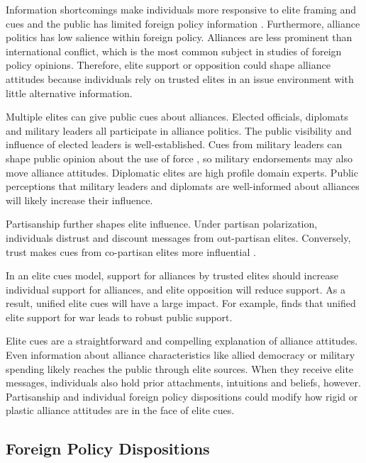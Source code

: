 \documentclass[12pt]{article}
\begin{document}
Information shortcomings make individuals more responsive to elite framing and cues \citep{Druckman2001, Peterson2017} and the public has limited foreign policy information \citep{BaumPotter2008}.
Furthermore, alliance politics has low salience within foreign policy. 
Alliances are less prominent than international conflict, which is the most common subject in studies of foreign policy opinions. 
Therefore, elite support or opposition could shape alliance attitudes because individuals rely on trusted elites in an issue environment with little alternative information. 


Multiple elites can give public cues about alliances.
Elected officials, diplomats and military leaders all participate in alliance politics.
The public visibility and influence of elected leaders is well-established.  
Cues from military leaders can shape public opinion about the use of force \citep{Golbyetal2018}, so military endorsements may also move alliance attitudes. 
Diplomatic elites are high profile domain experts. 
Public perceptions that military leaders and diplomats are well-informed about alliances will likely increase their influence. 


Partisanship further shapes elite influence.
Under partisan polarization, individuals distrust and discount messages from out-partisan elites. 
Conversely, trust makes cues from co-partisan elites more influential \citep{Druckmanetal2013}. 


In an elite cues model, support for alliances by trusted elites should increase individual support for alliances, and elite opposition will reduce support.  
As a result, unified elite cues will have a large impact.
For example, \citet{Berinsky2007} finds that unified elite support for war leads to robust public support. 


Elite cues are a straightforward and compelling explanation of alliance attitudes.
Even information about alliance characteristics like allied democracy or military spending likely reaches the public through elite sources. 
When they receive elite messages, individuals also hold prior attachments, intuitions and beliefs, however.
Partisanship and individual foreign policy dispositions could modify how rigid or plastic alliance attitudes are in the face of elite cues. 


\subsection{Foreign Policy Dispositions}
\end{document}
